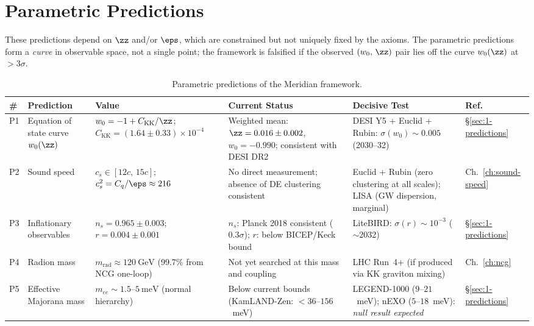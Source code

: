 \section{Parametric Predictions}
\label{app:pred-parametric}

These predictions depend on $\zz$ and/or $\eps$, which are constrained but not uniquely fixed by the axioms. The parametric predictions form a \emph{curve} in observable space, not a single point; the framework is falsified if the observed $(w_0,\, \zz)$ pair lies off the curve $w_0(\zz)$ at $>3\sigma$.

\begin{table}[h!]
\caption{Parametric predictions of the Meridian framework.}
\label{tab:pred-parametric}
\small
\renewcommand{\arraystretch}{1.25}
\begin{tabular}{@{}p{0.6cm}p{3.5cm}p{3.4cm}p{3.4cm}p{2.8cm}p{1.8cm}@{}}
\toprule
\textbf{\#} & \textbf{Prediction} & \textbf{Value} & \textbf{Current Status} & \textbf{Decisive Test} & \textbf{Ref.} \\
\midrule

P1 &
Equation of state curve $w_0(\zz)$ &
$w_0 = -1 + C_\mathrm{KK}/\zz$; $C_\mathrm{KK} = (1.64 \pm 0.33) \times 10^{-4}$ &
Weighted mean: $\zz = 0.016 \pm 0.002$, $w_0 = -0.990$; consistent with DESI DR2 &
DESI Y5 + Euclid + Rubin: $\sigma(w_0) \sim 0.005$ (2030--32) &
\S\ref{sec:1-predictions} \\

P2 &
Sound speed &
$c_s \in [12c,\, 15c]$; $c_s^2 = C_q/\eps \approx 216$ &
No direct measurement; absence of DE clustering consistent &
Euclid + Rubin (zero clustering at all scales); LISA (GW dispersion, marginal) &
Ch.~\ref{ch:sound-speed} \\

P3 &
Inflationary observables &
$n_s = 0.965 \pm 0.003$; $r = 0.004 \pm 0.001$ &
$n_s$: Planck 2018 consistent ($0.3\sigma$); $r$: below BICEP/Keck bound &
LiteBIRD: $\sigma(r) \sim 10^{-3}$ ($\sim$2032) &
\S\ref{sec:1-predictions} \\

P4 &
Radion mass &
$m_\mathrm{rad} \approx 120~\mathrm{GeV}$ (99.7\% from NCG one-loop) &
Not yet searched at this mass and coupling &
LHC Run~4+ (if produced via KK graviton mixing) &
Ch.~\ref{ch:ncg} \\

P5 &
Effective Majorana mass &
$m_{ee} \sim 1.5$--$5~\mathrm{meV}$ (normal hierarchy) &
Below current bounds (KamLAND-Zen: $< 36$--$156$~meV) &
LEGEND-1000 ($9$--$21$~meV); nEXO ($5$--$18$~meV): \emph{null result expected} &
\S\ref{sec:1-predictions} \\


\end{tabular}
\end{table}
